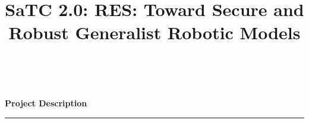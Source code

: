 \documentclass[11pt,letterpaper]{article}
\begin{document}
\pagestyle{empty} 


\setlength{\baselineskip}{12.6pt} %
\setlength{\normalbaselineskip}{12.6pt} %
\title{\Large
SaTC 2.0: RES: Toward Secure and Robust Generalist Robotic  Models} 
\begin{center}
   {\bfseries\filcenter} ~\vspace{2ex}
   {\Large\bfseries\filcenter
Project Description
\\\rule{\textwidth}{0.4pt}}
\end{center}








%
%
%


\newpage{}
\renewcommand\refname{References Cited}





\newpage{}


\newpage{}


\newpage{}


\newpage{}


\newpage{}


\newpage{}

\end{document}
